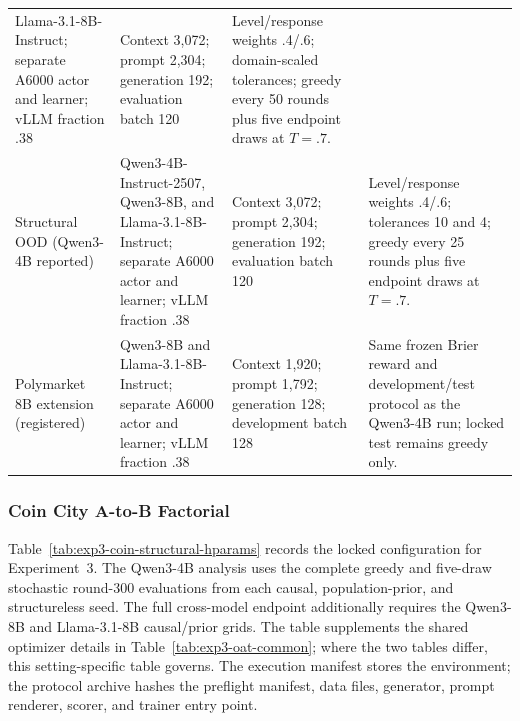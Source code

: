 \begin{center}
\begin{minipage}{\linewidth}
\begin{tabular}{p{.18\linewidth}p{.25\linewidth}p{.23\linewidth}p{.28\linewidth}}
Llama-3.1-8B-Instruct; separate A6000 actor and learner; vLLM fraction .38 &
Context 3,072; prompt 2,304; generation 192; evaluation batch 120 &
Level/response weights .4/.6; domain-scaled tolerances; greedy every 50 rounds
plus five endpoint draws at $T=.7$. \\
Structural OOD (Qwen3-4B reported) & Qwen3-4B-Instruct-2507, Qwen3-8B, and
Llama-3.1-8B-Instruct; separate A6000 actor and learner; vLLM fraction .38 & Context
3,072; prompt 2,304; generation 192; evaluation batch 120 & Level/response weights
.4/.6; tolerances 10 and 4; greedy every 25 rounds plus five endpoint draws at
$T=.7$. \\
Polymarket 8B extension (registered) & Qwen3-8B and Llama-3.1-8B-Instruct; separate A6000 actor
and learner; vLLM fraction .38 & Context 1,920; prompt 1,792; generation 128;
development batch 128 & Same frozen Brier reward and development/test protocol as
the Qwen3-4B run; locked test remains greedy only. \\
\bottomrule
\end{tabular}
\end{minipage}
\end{center}

\subsubsection{Coin City A-to-B Factorial}
\label{app:exp3-coin-structural-hparams}

Table~\ref{tab:exp3-coin-structural-hparams} records the locked configuration
for Experiment~3. The Qwen3-4B analysis uses the complete greedy and five-draw
stochastic round-300 evaluations from each causal, population-prior, and
structureless seed. The full cross-model endpoint additionally requires the
Qwen3-8B and Llama-3.1-8B causal/prior grids. The table supplements the shared optimizer
details in Table~\ref{tab:exp3-oat-common}; where the two tables differ, this
setting-specific table governs. The execution manifest stores the environment;
the protocol archive hashes the preflight manifest, data files,
generator, prompt renderer, scorer, and trainer entry point.

